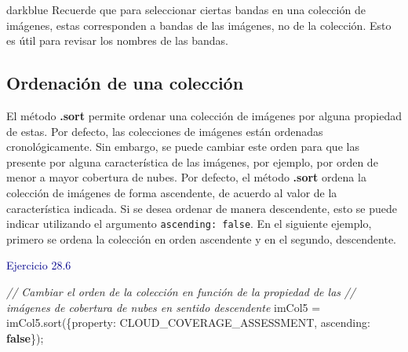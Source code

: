 \documentclass[
  12pt,
  letterpaper,
  twoside]{book}
\newenvironment{Shaded}{\begin{snugshade}}{\end{snugshade}}
\newcommand{\CommentTok}[1]{\textcolor[rgb]{0.24,0.58,0.00}{\textit{#1}}}
\newcommand{\DataTypeTok}[1]{\textcolor[rgb]{0.00,0.00,0.00}{#1}}
\newcommand{\FunctionTok}[1]{\textcolor[rgb]{0.48,0.12,0.64}{#1}}
\newcommand{\KeywordTok}[1]{\textcolor[rgb]{0.00,0.00,0.00}{\textbf{#1}}}
\newcommand{\NormalTok}[1]{#1}
\newcommand{\OperatorTok}[1]{\textcolor[rgb]{0.00,0.00,0.00}{#1}}
\newcommand{\StringTok}[1]{\textcolor[rgb]{0.87,0.29,0.22}{#1}}
\newcommand\boldpurple[1]{\textcolor{darkpurple}{\textbf{#1}}}
\begin{document}
\begin{bluebox2}

\begin{awesomeblock}{5pt}{\faLightbulb}{darkblue}
Recuerde que para seleccionar ciertas bandas en una colección de imágenes, estas corresponden a bandas de las imágenes, no de la colección. Esto es útil para revisar los nombres de las bandas.

\end{awesomeblock}

\end{bluebox2}

\hypertarget{ordenaciuxf3n-de-una-colecciuxf3n}{%
\subsection*{Ordenación de una colección}\label{ordenaciuxf3n-de-una-colecciuxf3n}}

El método \boldpurple{.sort} permite ordenar una colección de imágenes por alguna propiedad de estas. Por defecto, las colecciones de imágenes están ordenadas cronológicamente. Sin embargo, se puede cambiar este orden para que las presente por alguna característica de las imágenes, por ejemplo, por orden de menor a mayor cobertura de nubes. Por defecto, el método \boldpurple{.sort} ordena la colección de imágenes de forma ascendente, de acuerdo al valor de la característica indicada. Si se desea ordenar de manera descendente, esto se puede indicar utilizando el argumento \texttt{ascending:\ false}. En el siguiente ejemplo, primero se ordena la colección en orden ascendente y en el segundo, descendente.

\textcolor{darkblue}{Ejercicio 28.6}

\begin{Shaded}
\begin{Highlighting}[]
\CommentTok{// Cambiar el orden de la colección en función de la propiedad de las }
\CommentTok{// imágenes de cobertura de nubes en sentido descendente}
\NormalTok{imCol5 }\OperatorTok{=}\NormalTok{ imCol5}\OperatorTok{.}\FunctionTok{sort}\NormalTok{(\{}\DataTypeTok{property}\OperatorTok{:} \StringTok{\textquotesingle{}CLOUD\_COVERAGE\_ASSESSMENT\textquotesingle{}}\OperatorTok{,} 
  \DataTypeTok{ascending}\OperatorTok{:} \KeywordTok{false}\NormalTok{\})}\OperatorTok{;}
\end{Highlighting}
\end{Shaded}
\end{document}
